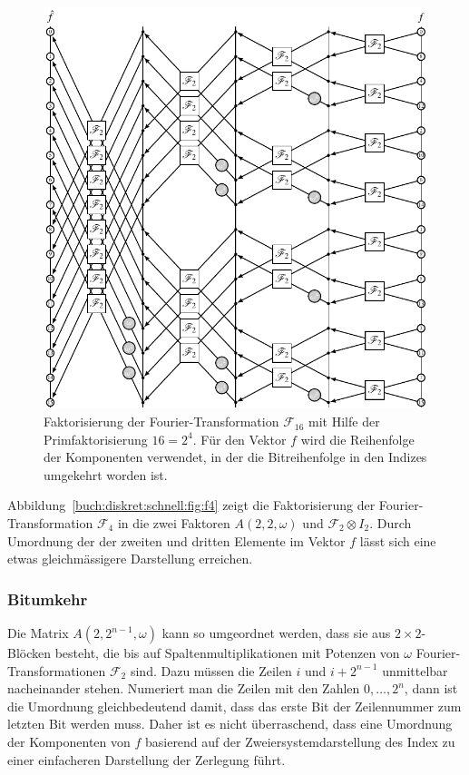 \begin{figure}
\centering
\includegraphics{chapters/060-diskret/images/f16.pdf}
\caption{Faktorisierung der Fourier-Transformation $\mathscr{F}_{16}$
mit Hilfe der Primfaktorisierung $16=2^4$.
Für den Vektor $f$ wird die Reihenfolge der Komponenten verwendet,
in der die Bitreihenfolge in den Indizes umgekehrt worden ist.
\label{buch:diskret:schnell:fig:f16}}
\end{figure}%

Abbildung~\ref{buch:diskret:schnell:fig:f4} zeigt die Faktorisierung
der Fourier-Transformation $\mathscr{F}_4$ in die zwei Faktoren
$A(2,2,\omega)$ und $\mathscr{F}_2\otimes I_2$.
Durch Umordnung der der zweiten und dritten Elemente im Vektor $f$
lässt sich eine etwas gleichmässigere Darstellung erreichen.

%
%
\subsubsection{Bitumkehr}
Die Matrix $A(2,2^{n-1},\omega)$ kann so umgeordnet werden, dass 
sie aus $2\times 2$-Blöcken besteht, die bis auf Spaltenmultiplikationen
mit Potenzen von $\omega$ Fourier-Transformationen $\mathscr{F}_2$ sind.
Dazu müssen die Zeilen $i$ und $i+2^{n-1}$ unmittelbar nacheinander
stehen.
Numeriert man die Zeilen mit den Zahlen $0,\dots,2^n$, dann ist die
Umordnung gleichbedeutend damit, dass das erste Bit der Zeilennummer
zum letzten Bit werden muss.
Daher ist es nicht überraschend, dass eine Umordnung der Komponenten
von $f$ basierend auf der Zweiersystemdarstellung des Index zu einer
einfacheren Darstellung der Zerlegung führt.


